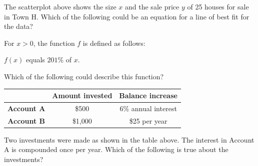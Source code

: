 The scatterplot above shows the size $x$ and the sale price $y$ of 25 houses for sale in Town H.  
Which of the following could be an equation for a line of best fit for the data?

\vspace{0.75em}


\newpage

\noindent\markforreview
\vspace{1em}

For $x > 0$, the function $f$ is defined as follows:  
\begin{center}

$f(x)$ equals $201\%$ of $x$.
\end{center}

Which of the following could describe this function?

\vspace{0.75em}



\vspace{2em}
\noindent\markforreview
\vspace{1em}

\begin{center}
\begin{tabular}{|c|c|c|}
\hline
& \textbf{Amount invested} & \textbf{Balance increase} \\
\hline
\textbf{Account A} & \$500 & 6\% annual interest \\
\textbf{Account B} & \$1,000 & \$25 per year \\
\hline
\end{tabular}
\end{center}

Two investments were made as shown in the table above.  
The interest in Account A is compounded once per year.  
Which of the following is true about the investments?

\vspace{0.75em}


